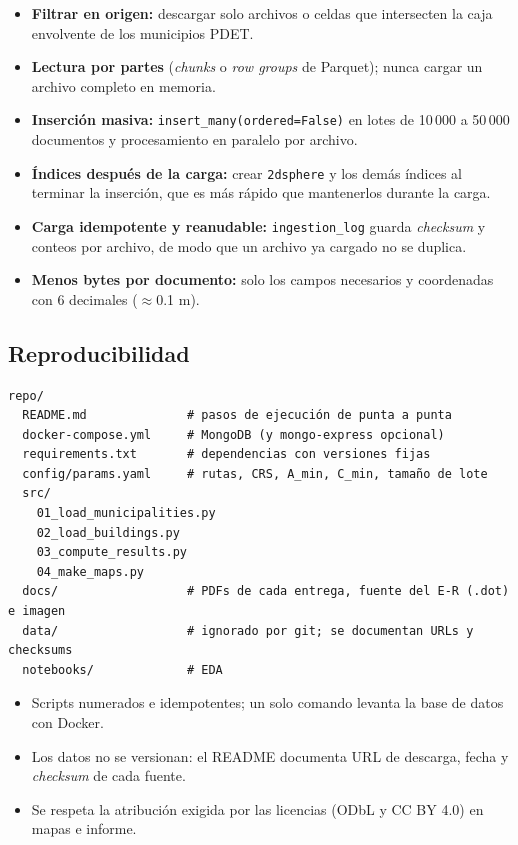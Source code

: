 \documentclass[11pt,letterpaper]{article}
\newenvironment{codebox}{\par\noindent\begin{minipage}{\linewidth}}{\end{minipage}\par}
\begin{document}
\begin{itemize}
  \item \textbf{Filtrar en origen:} descargar solo archivos o celdas que intersecten la caja
  envolvente de los municipios PDET.
  \item \textbf{Lectura por partes} (\emph{chunks} o \emph{row groups} de Parquet); nunca cargar un
  archivo completo en memoria.
  \item \textbf{Inserción masiva:} \texttt{insert\_many(ordered=False)} en lotes de 10\,000 a
  50\,000 documentos y procesamiento en paralelo por archivo.
  \item \textbf{Índices después de la carga:} crear \texttt{2dsphere} y los demás índices al
  terminar la inserción, que es más rápido que mantenerlos durante la carga.
  \item \textbf{Carga idempotente y reanudable:} \texttt{ingestion\_log} guarda \emph{checksum} y
  conteos por archivo, de modo que un archivo ya cargado no se duplica.
  \item \textbf{Menos bytes por documento:} solo los campos necesarios y coordenadas con 6
  decimales ($\approx$0.1 m).
\end{itemize}

\subsection{Reproducibilidad}

\begin{codebox}\begin{lstlisting}[style=lab,numbers=none,language=tree]
repo/
  README.md              # pasos de ejecución de punta a punta
  docker-compose.yml     # MongoDB (y mongo-express opcional)
  requirements.txt       # dependencias con versiones fijas
  config/params.yaml     # rutas, CRS, A_min, C_min, tamaño de lote
  src/
    01_load_municipalities.py
    02_load_buildings.py
    03_compute_results.py
    04_make_maps.py
  docs/                  # PDFs de cada entrega, fuente del E-R (.dot) e imagen
  data/                  # ignorado por git; se documentan URLs y checksums
  notebooks/             # EDA
\end{lstlisting}\end{codebox}

\begin{itemize}
  \item Scripts numerados e idempotentes; un solo comando levanta la base de datos con Docker.
  \item Los datos no se versionan: el README documenta URL de descarga, fecha y \emph{checksum} de
  cada fuente.
  \item Se respeta la atribución exigida por las licencias (ODbL y CC BY 4.0) en mapas e informe.
\end{itemize}
\end{document}
